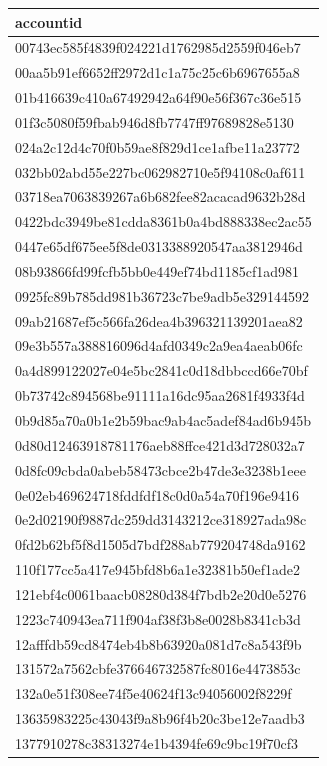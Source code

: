 \begin{tabular}{l}
\toprule
accountid \\
\midrule
00743ec585f4839f024221d1762985d2559f046eb7 \\
00aa5b91ef6652ff2972d1c1a75c25c6b6967655a8 \\
01b416639c410a67492942a64f90e56f367c36e515 \\
01f3c5080f59fbab946d8fb7747ff97689828e5130 \\
024a2c12d4c70f0b59ae8f829d1ce1afbe11a23772 \\
032bb02abd55e227bc062982710e5f94108c0af611 \\
03718ea7063839267a6b682fee82acacad9632b28d \\
0422bdc3949be81cdda8361b0a4bd888338ec2ac55 \\
0447e65df675ee5f8de0313388920547aa3812946d \\
08b93866fd99fcfb5bb0e449ef74bd1185cf1ad981 \\
0925fc89b785dd981b36723c7be9adb5e329144592 \\
09ab21687ef5c566fa26dea4b396321139201aea82 \\
09e3b557a388816096d4afd0349c2a9ea4aeab06fc \\
0a4d899122027e04e5bc2841c0d18dbbccd66e70bf \\
0b73742c894568be91111a16dc95aa2681f4933f4d \\
0b9d85a70a0b1e2b59bac9ab4ac5adef84ad6b945b \\
0d80d12463918781176aeb88ffce421d3d728032a7 \\
0d8fc09cbda0abeb58473cbce2b47de3e3238b1eee \\
0e02eb469624718fddfdf18c0d0a54a70f196e9416 \\
0e2d02190f9887dc259dd3143212ce318927ada98c \\
0fd2b62bf5f8d1505d7bdf288ab779204748da9162 \\
110f177cc5a417e945bfd8b6a1e32381b50ef1ade2 \\
121ebf4c0061baacb08280d384f7bdb2e20d0e5276 \\
1223c740943ea711f904af38f3b8e0028b8341cb3d \\
12afffdb59cd8474eb4b8b63920a081d7c8a543f9b \\
131572a7562cbfe376646732587fc8016e4473853c \\
132a0e51f308ee74f5e40624f13c94056002f8229f \\
13635983225c43043f9a8b96f4b20c3be12e7aadb3 \\
1377910278c38313274e1b4394fe69c9bc19f70cf3 \\

\end{tabular}
